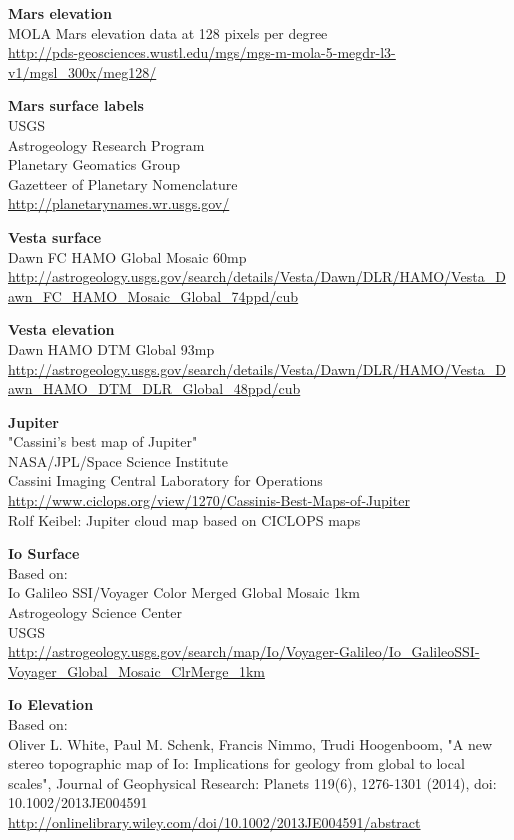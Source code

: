 \documentclass[Orbiter User Manual.tex]{subfiles}
\begin{document}
\textbf{Mars elevation}\\
MOLA Mars elevation data at 128 pixels per degree\\
\url{http://pds-geosciences.wustl.edu/mgs/mgs-m-mola-5-megdr-l3-v1/mgsl_300x/meg128/}

\textbf{Mars surface labels}\\
USGS\\
Astrogeology Research Program\\
Planetary Geomatics Group\\
Gazetteer of Planetary Nomenclature\\
\url{http://planetarynames.wr.usgs.gov/}

\textbf{Vesta surface}\\
Dawn FC HAMO Global Mosaic 60mp\\
\url{http://astrogeology.usgs.gov/search/details/Vesta/Dawn/DLR/HAMO/Vesta_Dawn_FC_HAMO_Mosaic_Global_74ppd/cub}

\textbf{Vesta elevation}\\
Dawn HAMO DTM Global 93mp\\
\url{http://astrogeology.usgs.gov/search/details/Vesta/Dawn/DLR/HAMO/Vesta_Dawn_HAMO_DTM_DLR_Global_48ppd/cub}

\textbf{Jupiter}\\
"Cassini's best map of Jupiter"\\
NASA/JPL/Space Science Institute\\
Cassini Imaging Central Laboratory for Operations\\
\url{http://www.ciclops.org/view/1270/Cassinis-Best-Maps-of-Jupiter}\\
Rolf Keibel: Jupiter cloud map based on CICLOPS maps

\textbf{Io Surface}\\
Based on:\\
Io Galileo SSI/Voyager Color Merged Global Mosaic 1km\\
Astrogeology Science Center\\
USGS\\
\url{http://astrogeology.usgs.gov/search/map/Io/Voyager-Galileo/Io_GalileoSSI-Voyager_Global_Mosaic_ClrMerge_1km}

\textbf{Io Elevation}\\
Based on:\\
Oliver L. White, Paul M. Schenk, Francis Nimmo, Trudi Hoogenboom, "A new stereo
topographic map of Io: Implications for geology from global to local scales",
Journal of Geophysical Research: Planets 119(6), 1276-1301 (2014), doi:
10.1002/2013JE004591\\
\url{http://onlinelibrary.wiley.com/doi/10.1002/2013JE004591/abstract}
\end{document}
